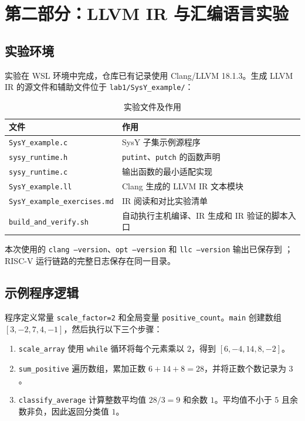 \documentclass[a4paper]{article}
\begin{document}
\section{第二部分：LLVM IR 与汇编语言实验}

\subsection{实验环境}

实验在 WSL 环境中完成，仓库已有记录使用 Clang/LLVM 18.1.3。生成 LLVM IR 的源文件和辅助文件位于 \texttt{lab1/SysY\_example/}：

\begin{table}[H]
  \centering
  \caption{实验文件及作用}
  \label{tab:files}
  \begin{tabular}{p{}p{}}
    \toprule
    文件 & 作用 \\
    \midrule
    \texttt{SysY\_example.c} & SysY 子集示例源程序 \\
    \texttt{sysy\_runtime.h} & \texttt{putint}、\texttt{putch} 的函数声明 \\
    \texttt{sysy\_runtime.c} & 输出函数的最小适配实现 \\
    \texttt{SysY\_example.ll} & Clang 生成的 LLVM IR 文本模块 \\
    \texttt{SysY\_example\_exercises.md} & IR 阅读和对比实验清单 \\
    \texttt{build\_and\_verify.sh} & 自动执行主机编译、IR 生成和 IR 验证的脚本入口 \\
    \bottomrule
  \end{tabular}
\end{table}

本次使用的 \texttt{clang --version}、\texttt{opt --version} 和 \texttt{llc --version} 输出已保存到 ；RISC-V 运行链路的完整日志保存在同一目录。

\subsection{示例程序逻辑}

程序定义常量 \texttt{scale\_factor=2} 和全局变量 \texttt{positive\_count}。\texttt{main} 创建数组 $[3,-2,7,4,-1]$，然后执行以下三个步骤：

\begin{enumerate}
  \item \texttt{scale\_array} 使用 \texttt{while} 循环将每个元素乘以 $2$，得到 $[6,-4,14,8,-2]$。
  \item \texttt{sum\_positive} 遍历数组，累加正数 $6+14+8=28$，并将正数个数记录为 $3$。
  \item \texttt{classify\_average} 计算整数平均值 $28/3=9$ 和余数 $1$。平均值不小于 $5$ 且余数非负，因此返回分类值 $1$。
\end{enumerate}
\end{document}
